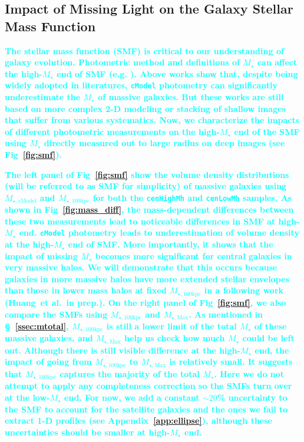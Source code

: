 \documentclass[a4paper,fleqn,usenatbib]{mnras}
\def\etal{{\ et al.~}}
\def\cmodel{\texttt{cModel}}
\def\rbcg{\texttt{cenHighMh}}
\def\nbcg{\texttt{cenLowMh}}
\def\mstar{{$M_{\star}$}}
\def\mtot{{$M_{\star,100\mathrm{kpc}}$}}
\def\mmax{{$M_{\star,\mathrm{Max}}$}}
\def\mcmodel{{$M_{\star,\mathrm{cModel}}$}}
\newcommand{\song}[1]{\textcolor{cyan}{\textbf{#1}}}
\begin{document}
\subsection{Impact of Missing Light on the Galaxy Stellar Mass Function}
    \label{ssec:smf}
    
    \song{
    The stellar mass function (SMF) is critical to our understanding of 
    galaxy evolution.
    Photometric method and definitions of \mstar{} can affect the 
    high-\mstar{} end of SMF (e.g. \citealt{Bernardi2013, dSouza2015, Bernardi2017}). 
    Above works show that, despite being widely adopted in literatures, \cmodel{} 
    photometry can significantly underestimate the \mstar{} of massive galaxies. 
    But these works are still based on more complex 2-D modeling or stacking of 
    shallow images that suffer from various systematics.
    Now, we characterize the impacts of different photometric measurements on the 
    high-\mstar{} end of the SMF using \mstar{} directly measured out to large 
    radius on deep images (see Fig~\ref{fig:smf}).
    }
    
    \song{
    The left panel of Fig~\ref{fig:smf} show the volume density distributions 
    (will be referred to as SMF for simplicity) of massive galaxies using \mcmodel{} 
    and \mtot{} for both the \rbcg{} and \nbcg{} samples.  
    As shown in Fig~\ref{fig:mass_diff}, the mass-dependent differences between these
    two measurements lead to noticeable differences in SMF at high-\mstar{} end.
    \cmodel{} photometry leads to underestimation of volume density at the high-\mstar{} 
    end of SMF. 
    More importantly, it shows that the impact of missing \mstar{} becomes more 
    significant for central galaxies in very massive halos. 
    We will demonstrate that this occurs because galaxies in more massive halos 
    have more extended stellar envelopes than those in lower mass halos at fixed 
    \mtot{} in a following work (Huang\etal in prep.).
    On the right panel of Fig~\ref{fig:smf}, we also compare the SMFs using \mtot{} and 
    \mmax{}. 
    As mentioned in \S~\ref{ssec:mtotal}, \mtot{} is still a lower limit of the total 
    \mstar{} of these massive galaxies, and \mmax{} help us check how much \mstar{} 
    could be left out.  
    Although there is still visible difference at the high-\mstar{} end, the impact
    of going from \mtot{} to \mmax{} is relatively small. 
    It suggests that \mtot{} captures the majority of the total \mstar{}.
    Here we do not attempt to apply any completeness correction so the SMFs turn over 
    at the low-\mstar{} end. 
    For now, we add a constant ${\sim}20$\% uncertainty to the SMF to account for the 
    satellite galaxies and the ones we fail to extract 1-D profiles 
    (see Appendix~\ref{app:ellipse}), although these uncertainties should be smaller 
    at high-\mstar{} end. 
    }     
\end{document}
